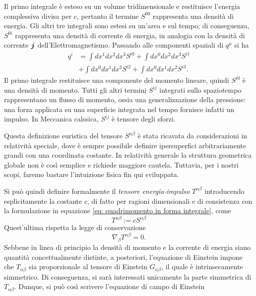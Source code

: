 Il primo integrale è esteso su un volume tridimensionale e restituisce l'energia complessiva divisa per $c$, pertanto il termine $S^{00}$ rappresenta una densità di energia. Gli altri tre integrali sono estesi su un'area e sul tempo; di conseguenza, $S^{0i}$ rappresenta una densità di corrente di energia, in analogia con la densità di corrente $\bm{j}$ dell'Elettromagnetismo. Passando alle componenti spaziali di $q^\mu$ si ha
\begin{equation}
    \begin{split}
        q^i &= \int dx^1 dx^2 dx^3 S^{i0} + \int dx^0 dx^2 dx^3 S^{i1} \\
        &+ \int dx^0 dx^1 dx^3 S^{i2} + \int dx^0 dx^1 dx^2 S^{i3}.
    \end{split}
\end{equation}
Il primo integrale restituisce una componente del momento lineare, quindi $S^{i0}$ è una densità di momento. Tutti gli altri termini $S^{ij}$ integrati sullo spaziotempo rappresentano un flusso di momento, ossia una generalizzazione della pressione: una forza applicata su una superficie integrata nel tempo fornisce infatti un impulso. In Meccanica calssica, $S^{ij}$ è tensore degli sforzi.
\begin{obs}
    Questa definizione euristica del tensore $S^{\alpha\beta}$ è stata ricavata da considerazioni in relatività speciale, dove è sempre possibile definire ipersuperfici arbitrariamente grandi con una coordinata costante. In relatività generale la struttura geometrica globale non è così semplice e richiede maggiore cautela. Tuttavia, per i nostri scopi, faremo bastare l'intuizione fisica fin qui sviluppata.
\end{obs}
Si può quindi definire formalmente il \emph{tensore energia-impulso} $T^{\alpha\beta}$ introducendo esplicitamente la costante $c$, di fatto per ragioni dimensionali e di consistenza con la formulazione in equazione \eqref{eq: quadrimomento in forma integrale}, come
\begin{equation}
    T^{\alpha\beta} := cS^{\alpha\beta}
\end{equation}
Quest'ultima rispetta la legge di conservazione
\begin{equation}
    \nabla_\beta T^{\alpha\beta} = 0.
\end{equation}
Sebbene in linea di principio la densità di momento e la corrente di energia siano quantità concettualmente distinte, a posteriori, l'equazione di Einstein impone che $T_{\alpha\beta}$ sia proporzionale al tensore di Einstein $G_{\alpha\beta}$, il quale è intrinsecamente simmetrico. Di conseguenza, si sarà interessati unicamente la parte simmetrica di $T_{\alpha\beta}$. Dunque, si può così scrivere l'equazione di campo di Einstein

